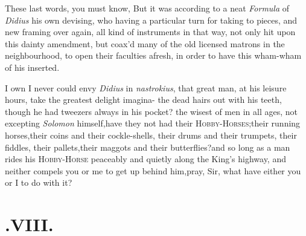 \documentclass{article}
\begin{document}
These last words, you must know,\break
{} 
 But
it was according to a neat \textit{Formula} of \textit{Didius} his own devising, who
having 
a particular turn for taking to pieces,\break
and new framing over again, all kind of\break
instruments in that way, not only hit\break
upon this dainty amendment, but coax’d\break
many of the old licensed matrons in the\break
neighbourhood, to open their faculties\break
afresh, in order to have this wham-wham\break
of his inserted.

I own I never could envy \textit{Didius} in
\textit{nastrokius}, that great man, at his leisure hours, take the
greatest delight imagina-
the dead hairs out with his teeth, though he had tweezers always in
his pocket?
 the wisest of
men in all ages, not excepting \textit{Solomon} himself,\tsk  have
they not had their
\textsc{Hobby-Horses};\tsk  their running
horses,\tsk  their coins and their cockle-shells, their drums and
their trumpets, their fiddles, their pallets,\tsk  their maggots
and their butterflies?\tsk  and so long as a man rides his
\textsc{Hobby-Horse} peaceably and quietly
along the King’s highway, and neither compels you or me to
get up behind him,\tsk  pray, Sir, what have either you or I to do
with it?

\section{.\enspace VIII.}
\end{document}
